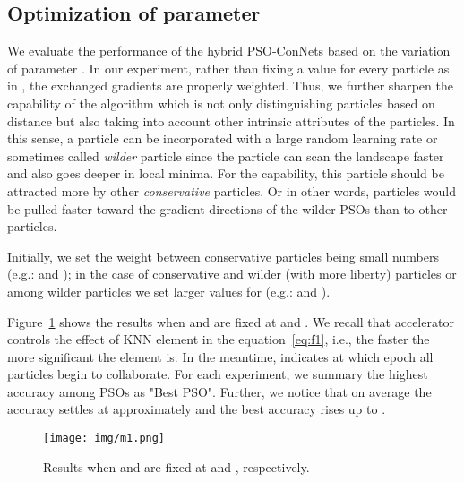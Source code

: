 \documentclass{ieeeaccess}
\begin{document}
\subsection{Optimization of parameter }
\label{sec:M}
We evaluate the performance of the hybrid PSO-ConNets based on the variation of parameter . In our experiment, rather than fixing a value  for every particle as in \cite{cucker2007emergent}, the exchanged gradients are properly weighted. Thus, we further sharpen the capability of the algorithm which is not only distinguishing particles based on distance but also taking into account other intrinsic attributes of the particles. In this sense, a particle can be incorporated with a large random learning rate or sometimes called \textit{wilder} particle since the particle can scan the landscape faster and also goes deeper in local minima. For the capability, this particle should be attracted more by other \textit{conservative} particles. Or in other words, particles would be pulled faster toward the gradient directions of the wilder PSOs than to other particles.

Initially, we set the weight  between conservative particles being small numbers (e.g.:  and ); in the case of conservative and wilder (with more liberty) particles or among wilder particles we set larger values for  (e.g.:  and ). 

Figure~\ref{fig:m1} shows the results when  and  are fixed at  and . We recall that accelerator  controls the effect of KNN element in the equation~\eqref{eq:f1}, i.e., the faster  the more significant the element is. In the meantime,  indicates at which epoch all particles begin to collaborate. For each experiment, we summary the highest accuracy among PSOs as "Best PSO". Further, we notice that on average the accuracy settles at approximately  and the best accuracy rises up to .
\begin{figure}[tb!]
\begin{center}
\texttt{[image: img/m1.png]}
\caption{Results when  and  are fixed at  and , respectively.}
\label{fig:m1}
\end{center}
\end{figure}
\end{document}
